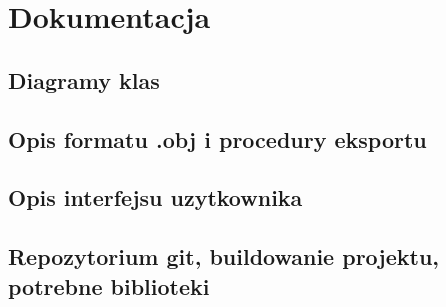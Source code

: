 \chapter{Dokumentacja}

\section{Diagramy klas}

\section{Opis formatu .obj i procedury eksportu}

\section{Opis interfejsu uzytkownika}

\section{Repozytorium git, buildowanie projektu, potrebne biblioteki}
